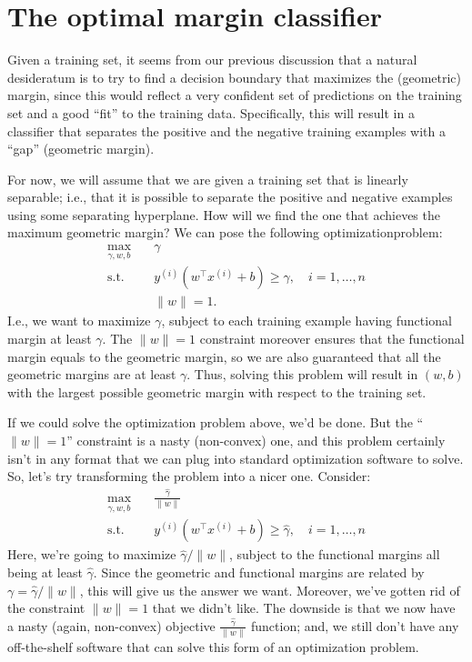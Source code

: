 \section{The optimal margin classifier}
Given a training set, it seems from our previous discussion that a natural
desideratum is to try to find a decision boundary that maximizes the (geometric)
margin, since this would reflect a very confident set of predictions
on the training set and a good ``fit'' to the training data. Specifically, this
will result in a classifier that separates the positive and the negative training
examples with a ``gap'' (geometric margin).

For now, we will assume that we are given a training set that is linearly
separable; i.e., that it is possible to separate the positive and negative examples
using some separating hyperplane. How will we find the one that
achieves the maximum geometric margin? We can pose the following optimizationproblem:
\begin{align*} %
    \max_{\gamma, w, b} \quad& \gamma\\
    \operatorname{s.t.} \quad& y^{(i)} (w^\top x^{(i)} + b) \ge \gamma, \quad i = 1,\ldots ,n\\
                \quad& \lVert w \rVert = 1.
\end{align*}
I.e., we want to maximize $\gamma$, subject to each training example having functional
margin at least $\gamma$. The $\lVert w \rVert = 1$ constraint moreover ensures that the
functional margin equals to the geometric margin, so we are also guaranteed
that all the geometric margins are at least $\gamma$. Thus, solving this problem will
result in $(w,b)$ with the largest possible geometric margin with respect to the
training set.

If we could solve the optimization problem above, we'd be done. But the
``$\lVert w \rVert = 1$'' constraint is a nasty (non-convex) one, and this problem certainly
isn't in any format that we can plug into standard optimization software to
solve. So, let's try transforming the problem into a nicer one. Consider:
\begin{align*} %
    \max_{\hat{\gamma},w,b} \quad& \frac{\hat{\gamma}}{\lVert w \rVert}\\
    \operatorname{s.t.} \quad& y^{(i)} (w^\top x^{(i)} + b) \ge \hat{\gamma}, \quad i = 1,\ldots ,n
\end{align*}
Here, we're going to maximize $\hat{\gamma}/\lVert w \rVert$, subject to the functional margins all
being at least $\hat{\gamma}$. Since the geometric and functional margins are related by
$\gamma = \hat{\gamma}/\lVert w \rVert$, this will give us the answer we want. Moreover, we've gotten rid %
of the constraint $\lVert w \rVert = 1$ that we didn't like. The downside is that we now
have a nasty (again, non-convex) objective $\frac{\hat{\gamma}}{\lVert w \rVert}$ function;
and, we still don't have any off-the-shelf software that can solve this form of an optimization problem.

